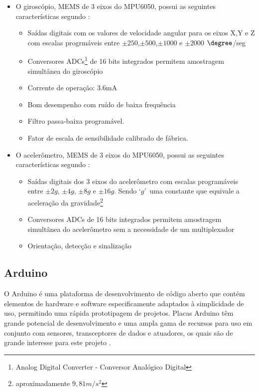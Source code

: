 	\begin{description}
		\item[Características do MPU6050] 
		\item \begin{itemize} 
			\item  O giroscópio, MEMS de 3 eixos do MPU6050, possui as seguintes características segundo \cite{mpu6050}:
			\begin{itemize}
				\item Saídas digitais com os valores de velocidade angular para os eixos X,Y e Z com escalas progrmáveis entre $ \pm250 $,$ \pm500 $,$ \pm1000 $ e $ \pm 2000$ $\degree$/seg
				\item Conversores ADCs\footnote{Analog Digital Converter - Conversor Analógico Digital} de 16 bits integrados permitem amostragem simultânea do giroscópio
				\item Corrente de operação: 3.6mA
				\item Bom desempenho com ruído de baixa frequência
				\item Filtro passa-baixa programável.
				\item Fator de escala de sensibilidade calibrado de fábrica.
			\end{itemize}
			\item O acelerômetro, MEMS de 3 eixos do MPU6050, possui as seguintes características segundo \cite{mpu6050}:\begin{itemize}
				\item Saídas digitais dos 3 eixos do acelerômetro com escalas programáveis entre $\pm2g$, $\pm4g$, $\pm8g$ e $\pm16g$. Sendo \textquoteleft$ g$\textquoteright \ uma constante que equivale a aceleração da gravidade\footnote{aproximadamente $9,81 m/s^2 $}
				\item Conversores ADCs de 16 bits integrados permitem amostragem simultânea do acelerômetro sem a necessidade de um multiplexador
				\item Orientação, detecção e sinalização
				
			\end{itemize}
		\end{itemize}
	\end{description}
	
	
	

\subsection{Arduino}

O Arduino é uma plataforma de desenvolvimento de código aberto que contém elementos de hardware e software especificamente adaptados à simplicidade de uso, permitindo uma rápida prototipagem de projetos. Placas Arduino têm grande potencial de desenvolvimento e uma ampla gama de recursos para uso em conjunto com sensores, transceptores de dados e atuadores, os quais são de grande interesse para este projeto \cite{smith2016}.

